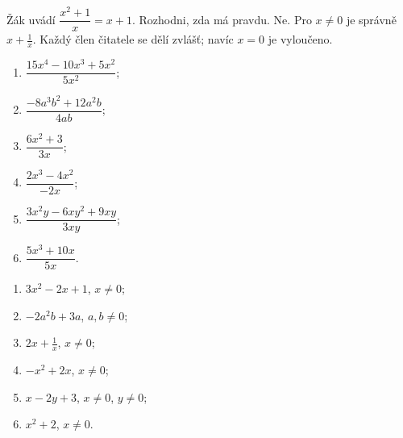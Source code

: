 \documentclass[11pt,a4paper]{article}
\begin{document}
\begin{zadaniReseniBox}[breakable=false,title={Rozšíření 1}]
Žák uvádí $\dfrac{x^2+1}{x}=x+1$. Rozhodni, zda má pravdu.
\tcblower
Ne. Pro $x\ne0$ je správně $x+\frac1x$. Každý člen čitatele se dělí zvlášť; navíc $x=0$ je vyloučeno.
\end{zadaniReseniBox}
\begin{zadaniReseniBox}[breakable=false,title={Domácí úkol}]
\begin{enumerate}[label=\alph*)]
\item $\dfrac{15x^4-10x^3+5x^2}{5x^2}$;
\item $\dfrac{-8a^3b^2+12a^2b}{4ab}$;
\item $\dfrac{6x^2+3}{3x}$;
\item $\dfrac{2x^3-4x^2}{-2x}$;
\item $\dfrac{3x^2y-6xy^2+9xy}{3xy}$;
\item $\dfrac{5x^3+10x}{5x}$.
\end{enumerate}
\tcblower
\begin{enumerate}[label=\alph*)]
\item $3x^2-2x+1$, $x\ne0$;
\item $-2a^2b+3a$, $a,b\ne0$;
\item $2x+\frac1x$, $x\ne0$;
\item $-x^2+2x$, $x\ne0$;
\item $x-2y+3$, $x\ne0$, $y\ne0$;
\item $x^2+2$, $x\ne0$.
\end{enumerate}
\end{zadaniReseniBox}
\end{document}
